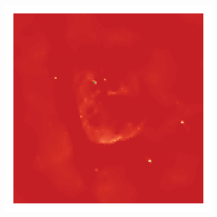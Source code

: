 \begin{figure}[h]
\begin{subfigure}[b]{0.3\linewidth}
	\end{subfigure}
	\begin{subfigure}[b]{0.3\linewidth}
		\includegraphics[width=\linewidth, trim={18px 19px 18px 18px}, clip]{./chapters/05.results/g55/starlets3_model.png}
	\end{subfigure}
	

\end{figure}
